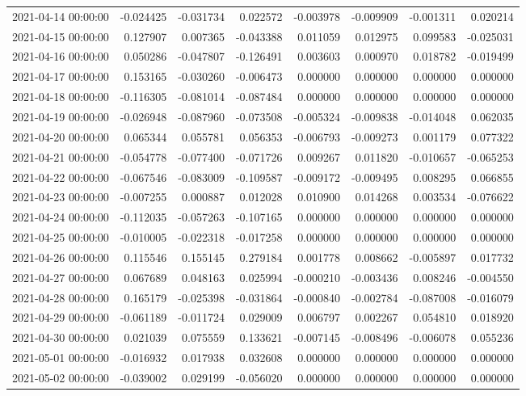 \begin{tabular}{lrrrrrrr}
2021-04-14 00:00:00 & -0.024425 & -0.031734 & 0.022572 & -0.003978 & -0.009909 & -0.001311 & 0.020214 \\
2021-04-15 00:00:00 & 0.127907 & 0.007365 & -0.043388 & 0.011059 & 0.012975 & 0.099583 & -0.025031 \\
2021-04-16 00:00:00 & 0.050286 & -0.047807 & -0.126491 & 0.003603 & 0.000970 & 0.018782 & -0.019499 \\
2021-04-17 00:00:00 & 0.153165 & -0.030260 & -0.006473 & 0.000000 & 0.000000 & 0.000000 & 0.000000 \\
2021-04-18 00:00:00 & -0.116305 & -0.081014 & -0.087484 & 0.000000 & 0.000000 & 0.000000 & 0.000000 \\
2021-04-19 00:00:00 & -0.026948 & -0.087960 & -0.073508 & -0.005324 & -0.009838 & -0.014048 & 0.062035 \\
2021-04-20 00:00:00 & 0.065344 & 0.055781 & 0.056353 & -0.006793 & -0.009273 & 0.001179 & 0.077322 \\
2021-04-21 00:00:00 & -0.054778 & -0.077400 & -0.071726 & 0.009267 & 0.011820 & -0.010657 & -0.065253 \\
2021-04-22 00:00:00 & -0.067546 & -0.083009 & -0.109587 & -0.009172 & -0.009495 & 0.008295 & 0.066855 \\
2021-04-23 00:00:00 & -0.007255 & 0.000887 & 0.012028 & 0.010900 & 0.014268 & 0.003534 & -0.076622 \\
2021-04-24 00:00:00 & -0.112035 & -0.057263 & -0.107165 & 0.000000 & 0.000000 & 0.000000 & 0.000000 \\
2021-04-25 00:00:00 & -0.010005 & -0.022318 & -0.017258 & 0.000000 & 0.000000 & 0.000000 & 0.000000 \\
2021-04-26 00:00:00 & 0.115546 & 0.155145 & 0.279184 & 0.001778 & 0.008662 & -0.005897 & 0.017732 \\
2021-04-27 00:00:00 & 0.067689 & 0.048163 & 0.025994 & -0.000210 & -0.003436 & 0.008246 & -0.004550 \\
2021-04-28 00:00:00 & 0.165179 & -0.025398 & -0.031864 & -0.000840 & -0.002784 & -0.087008 & -0.016079 \\
2021-04-29 00:00:00 & -0.061189 & -0.011724 & 0.029009 & 0.006797 & 0.002267 & 0.054810 & 0.018920 \\
2021-04-30 00:00:00 & 0.021039 & 0.075559 & 0.133621 & -0.007145 & -0.008496 & -0.006078 & 0.055236 \\
2021-05-01 00:00:00 & -0.016932 & 0.017938 & 0.032608 & 0.000000 & 0.000000 & 0.000000 & 0.000000 \\
2021-05-02 00:00:00 & -0.039002 & 0.029199 & -0.056020 & 0.000000 & 0.000000 & 0.000000 & 0.000000 \\

\end{tabular}
